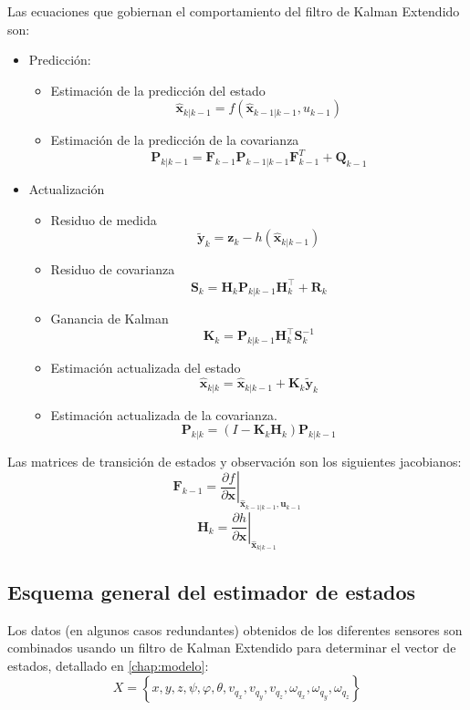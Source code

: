 \documentclass[main]{subfiles}
\begin{document}
Las ecuaciones que gobiernan el comportamiento del filtro de Kalman Extendido son:
\begin{itemize}
	\item Predicción:
	\begin{itemize}
		\item Estimación de la predicción del estado
		$$\hat{\mathbf{x}}_{k|k-1} = f(\hat{\mathbf{x}}_{k-1|k-1}, u_{k-1})$$
		\item Estimación de la predicción de la covarianza
		$$ \mathbf{P}_{k|k-1} =  {{\mathbf{F}_{k-1}}} \mathbf{P}_{k-1|k-1}{  {\mathbf{F}_{k-1}^T}} + \mathbf{Q}_{k-1} $$		
	\end{itemize}
	\item Actualización
	\begin{itemize}
		\item Residuo de medida
		$$\tilde{\mathbf{y}}_{k} = \mathbf{z}_{k} - h(\hat{\mathbf{x}}_{k|k-1})$$
		\item Residuo de covarianza
		$$\mathbf{S}_{k} = { \mathbf{H}_{k}}\mathbf{P}_{k|k-1}{ \mathbf{H}_{k}^\top} + \mathbf{R}_{k}$$
		\item Ganancia de Kalman
		$$\mathbf{K}_{k} = \mathbf{P}_{k|k-1}{ \mathbf{H}_{k}^\top}\mathbf{S}_{k}^{-1} $$
		\item Estimación actualizada del estado
		$$\hat{\mathbf{x}}_{k|k} = \hat{\mathbf{x}}_{k|k-1} + \mathbf{K}_{k}\tilde{\mathbf{y}}_{k} $$
		\item Estimación actualizada de la covarianza.
		$$ \mathbf{P}_{k|k} = (I - \mathbf{K}_{k} { \mathbf{H}_{k}}) \mathbf{P}_{k|k-1} $$		
	\end{itemize}
\end{itemize}

Las matrices de transición de estados y observación son los siguientes jacobianos:
$$ { \mathbf{F}_{k-1}} = \left . \frac{\partial f}{\partial \mathbf{x} } \right \vert _{\hat{\mathbf{x}}_{k-1|k-1},\mathbf{u}_{k-1}} $$
\vspace{10pt}
$$ { \mathbf{H}_{k}} = \left . \frac{\partial h}{\partial \mathbf{x} } \right \vert _{\hat{\mathbf{x}}_{k|k-1}} $$


\subsection{Esquema general del estimador de estados}

Los datos (en algunos casos redundantes) obtenidos de los diferentes sensores son combinados usando un filtro de Kalman Extendido para determinar el vector de estados, detallado en \ref{chap:modelo}:
\begin{equation}
  \label{eq:estado}
  X=\left\lbrace  x,y,z,\psi,\varphi,\theta, v_{q_x},v_{q_y},v_{q_z},\omega_{q_x},\omega_{q_y},\omega_{q_z} \right\rbrace
\end{equation}
\end{document}
